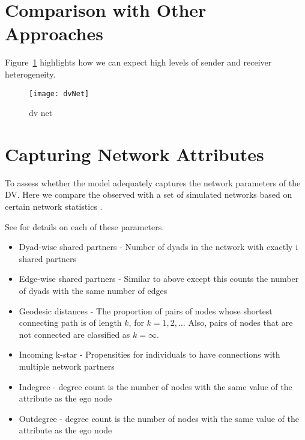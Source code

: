 \section{Comparison with Other Approaches}

\citet{ingold:2008}

\citet{ingold:fischer:2014}

\citet{ingold:leifeld:2014}

Figure~\ref{fig:dvNet} highlights how we can expect high levels of sender and receiver heterogeneity. 

\begin{figure}[ht]
	\centering
	\texttt{[image: dvNet]}
	\caption{dv net}
	\label{fig:dvNet}
\end{figure}

\citet{krivitsky:handcock:2015}



\section{Capturing Network Attributes}

To assess whether the model adequately captures the network parameters of the DV. Here we compare the observed with a set of simulated networks based on certain network statistics \citep{hunter:etal:2008}. 

See \citet{morris:etal:2008} for details on each of these parameters. 

\begin{itemize}
\item Dyad-wise shared partners - Number of dyads in the network with exactly i shared partners
\item Edge-wise shared partners - Similar to above except this counts the number of dyads with the same number of edges
\item Geodesic distances - The proportion of pairs of nodes whose shortest connecting path is of length $k$, for $k=1,2,\ldots$ Also, pairs of nodes that are not connected are classified as $k=\infty$.
\item Incoming k-star - Propensities for individuals to have connections with multiple network partners
\item Indegree - degree count is the number of nodes with the same value of the attribute as the ego node
\item Outdegree - degree count is the number of nodes with the same value of the attribute as the ego node
\end{itemize}

